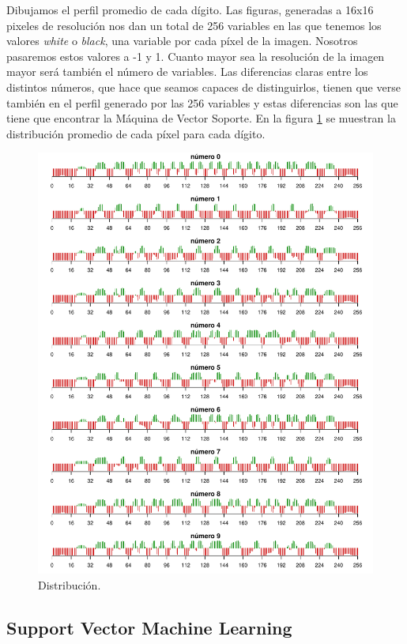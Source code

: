\documentclass[12pt,spanish,a4paper]{article}
\numberwithin{equation}{section}
\begin{document}
Dibujamos el perfil promedio de cada dígito. Las figuras, generadas a
16x16 pixeles de resolución nos dan un total de 256 variables en las que
tenemos los valores \emph{white} o \emph{black}, una variable por cada
píxel de la imagen. Nosotros pasaremos estos valores a -1 y 1. Cuanto
mayor sea la resolución de la imagen mayor será también el número de
variables. Las diferencias claras entre los distintos números, que hace
que seamos capaces de distinguirlos, tienen que verse también en el
perfil generado por las 256 variables y estas diferencias son las que
tiene que encontrar la Máquina de Vector Soporte. En la figura
\ref{fig:perfiles_digitos} se muestran la distribución promedio de cada
píxel para cada dígito.

\begin{figure}[h]

{\centering \includegraphics[width=0.8\linewidth]{graphics/svm/perfiles_digitos-1} 

}

\caption{Distribución.}\label{fig:perfiles_digitos}
\end{figure}

\hypertarget{support-vector-machine-learning}{%
\subsection{Support Vector Machine
Learning}\label{support-vector-machine-learning}}
\end{document}
